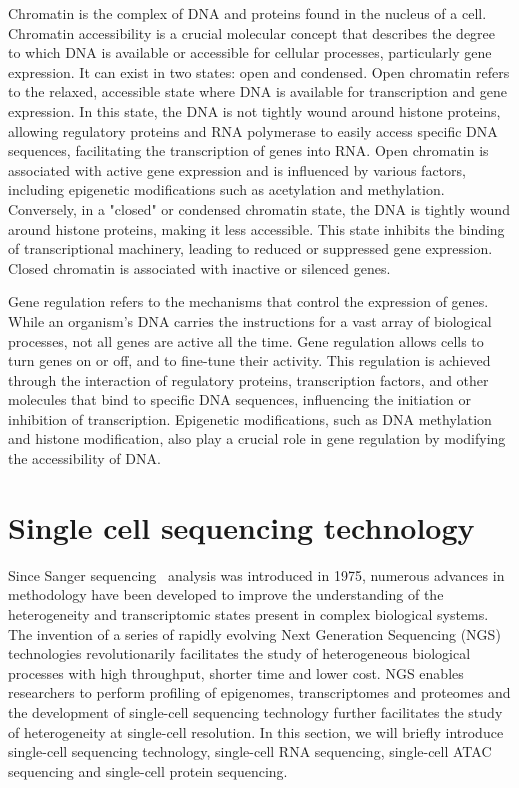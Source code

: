 Chromatin is the complex of DNA and proteins found in the nucleus of a cell. Chromatin accessibility is a crucial molecular concept that describes the degree to which DNA is available or accessible for cellular processes, particularly gene expression. It can exist in two states: open and condensed. Open chromatin refers to the relaxed, accessible state where DNA is available for transcription and gene expression. In this state, the DNA is not tightly wound around histone proteins, allowing regulatory proteins and RNA polymerase to easily access specific DNA sequences, facilitating the transcription of genes into RNA. Open chromatin is associated with active gene expression and is influenced by various factors, including epigenetic modifications such as acetylation and methylation. Conversely, in a "closed" or condensed chromatin state, the DNA is tightly wound around histone proteins, making it less accessible. This state inhibits the binding of transcriptional machinery, leading to reduced or suppressed gene expression. Closed chromatin is associated with inactive or silenced genes.

Gene regulation refers to the mechanisms that control the expression of genes. While an organism's DNA carries the instructions for a vast array of biological processes, not all genes are active all the time. Gene regulation allows cells to turn genes on or off, and to fine-tune their activity. This regulation is achieved through the interaction of regulatory proteins, transcription factors, and other molecules that bind to specific DNA sequences, influencing the initiation or inhibition of transcription. Epigenetic modifications, such as DNA methylation and histone modification, also play a crucial role in gene regulation by modifying the accessibility of DNA.


\section{Single cell sequencing technology}
\label{background:profiling_singlecell}
Since Sanger sequencing~\citep{sanger1975rapid} analysis was introduced in 1975, numerous advances in methodology have been developed to improve the understanding of the heterogeneity and transcriptomic states present in complex biological systems. The invention of a series of rapidly evolving Next Generation Sequencing (NGS) technologies revolutionarily facilitates the study of heterogeneous biological processes with high throughput, shorter time and lower cost\citep{svensson2018exponential}. NGS enables researchers to perform profiling of epigenomes, transcriptomes and proteomes and the development of single-cell sequencing technology further facilitates the study of heterogeneity at single-cell resolution. In this section, we will briefly introduce single-cell sequencing technology, single-cell RNA sequencing, single-cell ATAC sequencing and single-cell protein sequencing.

